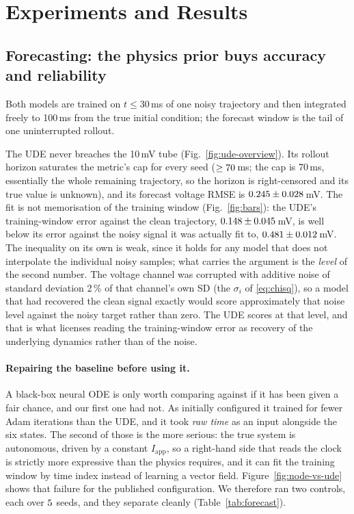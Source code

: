 \documentclass{article}
\newcommand{\Tfull}{100}       %
\newcommand{\Ttrain}{30}       %
\newcommand{\Ttube}{10}        %
\newcommand{\Rcap}{70}         %
\newcommand{\NoisePct}{2}      %
\begin{document}
\section{Experiments and Results}
\label{sec:results}

\subsection{Forecasting: the physics prior buys accuracy and reliability}
\label{sec:results-forecasting}

Both models are trained on $t\le\Ttrain$\,ms of one noisy trajectory and then
integrated freely to \Tfull\,ms from the true initial condition; the forecast
window is the tail of one uninterrupted rollout.

The UDE never breaches the \Ttube\,mV tube (Fig.~\ref{fig:ude-overview}). Its
rollout horizon saturates the
metric's cap for every seed ($\ge 70$\,ms; the cap is \Rcap\,ms,
essentially the whole remaining trajectory, so the horizon is right-censored and
its true value is unknown), and its forecast voltage RMSE is
$0.245 \pm 0.028$\,mV.
The fit is not memorisation of the training window (Fig.~\ref{fig:bars}): the
UDE's training-window error against the clean trajectory,
$0.148 \pm 0.045$\,mV, is well below its error against the noisy signal
it was actually fit to, $0.481 \pm 0.012$\,mV. The inequality on its own is weak, since
it holds for any model that does not interpolate the individual noisy samples;
what carries the argument is the \emph{level} of the second number. The voltage
channel was corrupted with additive noise of standard deviation \NoisePct\,\% of
that channel's own SD (the $\sigma_i$ of \eqref{eq:chisq}), so a model that had
recovered the clean signal exactly would score approximately that noise level
against the noisy target rather than zero. The UDE scores at that level, and
that is what licenses reading the training-window error as recovery of the
underlying dynamics rather than of the noise.

\paragraph{Repairing the baseline before using it.}
A black-box neural ODE is only worth comparing against if it has been given a
fair chance, and our first one had not. As initially configured it trained for
fewer Adam iterations than the UDE, and it took \emph{raw time} as an input
alongside the six states. The second of those is the more serious: the true
system is autonomous, driven by a constant $I_{\mathrm{app}}$, so a right-hand
side that reads the clock is strictly more expressive than the physics requires,
and it can fit the training window by time index instead of learning a vector
field. Figure~\ref{fig:node-vs-ude} shows that failure for the published
configuration. We therefore ran two controls, each over
$5$ seeds, and they separate cleanly
(Table~\ref{tab:forecast}).
\end{document}
